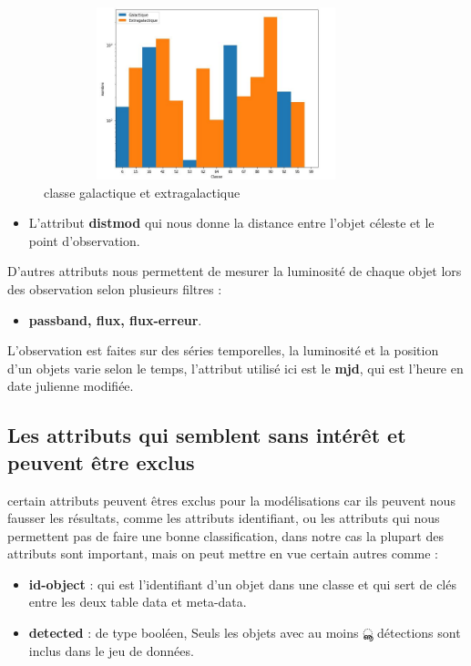 \begin{figure}[!h]
    \centering
    \includegraphics[width=10cm,height=5cm]{report/figures/galactic.jpg}
    \caption{classe galactique et extragalactique}
    \label{fig:my_label}
\end{figure}
\newline
\begin{itemize}
    \item L’attribut \textbf{distmod} qui nous donne la distance entre l’objet céleste et le point d’observation.
\end{itemize}



\newline
D’autres attributs nous permettent de mesurer la luminosité de chaque objet lors des observation selon plusieurs filtres :
\begin{itemize}
    \item \textbf{passband, flux, flux-erreur}.
\end{itemize}
\newline
L’observation est faites sur des séries temporelles, la luminosité et la position d’un objets varie selon le temps, l’attribut utilisé ici est le \textbf{mjd}, qui est l’heure en date julienne modifiée.

\subsection{Les attributs qui semblent sans intérêt et peuvent être exclus}
certain attributs peuvent êtres exclus pour la modélisations car ils peuvent nous fausser les résultats, comme les attributs identifiant, ou les attributs qui nous permettent pas de faire une bonne classification, dans notre cas la plupart des attributs sont important, mais on peut mettre en vue certain autres comme :
\begin{itemize}
    \item \textbf{id-object }: qui est l’identifiant d’un objet dans une classe et qui sert de clés entre les deux table data et meta-data.
    \item \textbf{detected }: de type booléen, Seuls les objets avec au moins ൣ détections sont inclus
dans le jeu de données.
\end{itemize}
